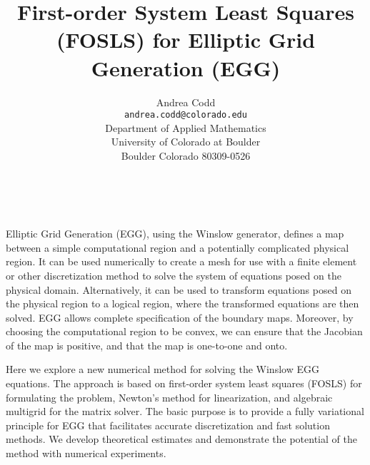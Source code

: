 \documentclass[11pt]{article}
\date{ ~ \hspace{-4mm}}
\title{First-order System Least Squares (FOSLS) for Elliptic Grid Generation (EGG)   }
\author{Andrea Codd \\ {\tt andrea.codd@colorado.edu} \\ Department of Applied Mathematics  \\  University of Colorado at Boulder  \\  Boulder Colorado 80309-0526  \\}
\begin{document}
\maketitle
\thispagestyle{empty}




 
 


 
Elliptic Grid Generation (EGG), using the Winslow generator, defines a map
between a simple computational region and a potentially complicated
physical region.  It can be used numerically to create a mesh for use with
a finite element or other discretization method to solve the system of
equations posed on the physical domain.  Alternatively, it can be used to
transform equations posed on the physical region to a logical region,
where the transformed equations are then solved.  EGG allows complete
specification of the boundary maps.  Moreover, by choosing the
computational region to be convex, we can ensure that the Jacobian of the
map is positive, and that the map is one-to-one and onto.



Here we explore a new numerical method for solving the Winslow EGG
equations.  The approach is based on first-order system least squares
(FOSLS) for formulating the problem, Newton's method for linearization,
and algebraic multigrid for the matrix solver.  The basic purpose is to
provide a fully variational principle for EGG that facilitates accurate
discretization and fast solution methods.  We develop theoretical
estimates and demonstrate the potential of the method with numerical
experiments.    

 
 
\end{document}
